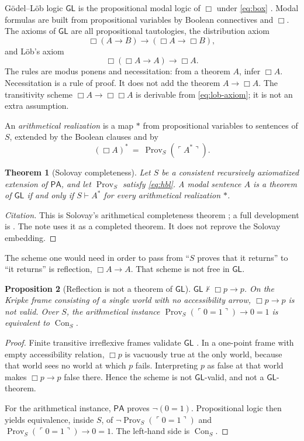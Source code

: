 \documentclass[11pt]{article}
\newcommand{\gn}[1]{\ulcorner #1 \urcorner}
\DeclareMathOperator{\Prov}{Prov}
\DeclareMathOperator{\Con}{Con}
\newcommand{\PA}{\mathsf{PA}}
\newcommand{\GL}{\mathsf{GL}}
\newtheorem{theorem}{Theorem}
\newtheorem{proposition}[theorem]{Proposition}
\theoremstyle{definition}
\theoremstyle{remark}
\begin{document}
G\"odel--L\"ob logic \(\GL\) is the propositional modal logic of \(\Box\) under \eqref{eq:box} \citep{solovay1976,boolos1993}.
Modal formulas are built from propositional variables by Boolean connectives and \(\Box\).
The axioms of \(\GL\) are all propositional tautologies, the distribution axiom
\[
\Box(A\to B)\to(\Box A\to\Box B),
\]
and L\"ob's axiom
\begin{equation}
\label{eq:lob-axiom}
\Box(\Box A\to A)\to\Box A.
\end{equation}
The rules are modus ponens and necessitation: from a theorem \(A\), infer \(\Box A\).
Necessitation is a rule of proof.
It does not add the theorem \(A\to\Box A\).
The transitivity scheme \(\Box A\to\Box\Box A\) is derivable from \eqref{eq:lob-axiom}; it is not an extra assumption.

An \emph{arithmetical realization} is a map \(*\) from propositional variables to sentences of \(S\), extended by the Boolean clauses and by
\[
(\Box A)^{*}\ =\ \Prov_{S}(\gn{A^{*}}).
\]

\begin{theorem}[Solovay completeness]
\label{thm:solovay}
Let \(S\) be a consistent recursively axiomatized extension of \(\PA\), and let \(\Prov_{S}\) satisfy \eqref{eq:hbl}.
A modal sentence \(A\) is a theorem of \(\GL\) if and only if \(S\vdash A^{*}\) for every arithmetical realization \(*\).
\end{theorem}

\begin{proof}[Citation]
This is Solovay's arithmetical completeness theorem \citep{solovay1976}; a full development is \citet[Chapters~1--5]{boolos1993}.
The note uses it as a completed theorem.
It does not reprove the Solovay embedding.
\end{proof}

The scheme one would need in order to pass from ``\(S\) proves that it returns'' to ``it returns'' is reflection, \(\Box A\to A\).
That scheme is not free in \(\GL\).

\begin{proposition}[Reflection is not a theorem of \(\GL\)]
\label{prop:no-reflection}
\(\GL\nvdash \Box p\to p\).
On the Kripke frame consisting of a single world with no accessibility arrow, \(\Box p\to p\) is not valid.
Over \(S\), the arithmetical instance \(\Prov_{S}(\gn{0=1})\to 0=1\) is equivalent to \(\Con_{S}\).
\end{proposition}

\begin{proof}
Finite transitive irreflexive frames validate \(\GL\) \citep{boolos1993}.
In a one-point frame with empty accessibility relation, \(\Box p\) is vacuously true at the only world, because that world sees no world at which \(p\) fails.
Interpreting \(p\) as false at that world makes \(\Box p\to p\) false there.
Hence the scheme is not \(\GL\)-valid, and not a \(\GL\)-theorem.

For the arithmetical instance, \(\PA\) proves \(\neg(0=1)\).
Propositional logic then yields equivalence, inside \(S\), of \(\neg\Prov_{S}(\gn{0=1})\) and \(\Prov_{S}(\gn{0=1})\to 0=1\).
The left-hand side is \(\Con_{S}\).
\end{proof}
\end{document}
